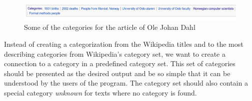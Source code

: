 
\begin{figure}[H]
\centering
\includegraphics[width=\textwidth]{Dumps/imgs/olejohandahl-categories.png}
\caption[Categories for an Wikipedia article]{Some of the categories for the article of Ole Johan Dahl}
\label{fig: olejohandahl_categories}
\end{figure}




Instead of creating a categorization from the Wikipedia titles and to the most describing categories from Wikipedia's category set, we want to create a connection to a category in a predefined category set. This set of categories should be presented as the desired output and be so simple that it can be understood by the users of the program. The category set should also contain a special category \emph{unknown} for texts where no category is found.

